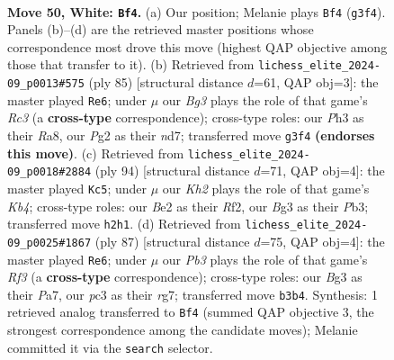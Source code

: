 \documentclass[11pt]{article}
\begin{document}
\clearpage

\begin{figure}[p]\centering
\begin{subfigure}{0.46\textwidth}\centering
\resizebox{\linewidth}{!}{%
\newchessgame
\chessboard[
  setfen={5b1r/p6p/P4k1n/3r4/8/1Pp3BP/R1P1B1PK/2R5 w - - 7 50},
  showmover=false,
  pgfstyle=straightmove, color=movearrow, markmove={g3-f4}
]}
\caption{}
\end{subfigure}\hfill
\begin{subfigure}{0.46\textwidth}\centering
\resizebox{\linewidth}{!}{%
\newchessgame
\chessboard[
  setfen={r5k1/3N1p1p/p1r3p1/B2p4/1PbP1P2/7P/5KP1/4R3 b - - 3 43},
  showmover=false,
  pgfstyle=straightmove, color=movearrow, markmove={c6-e6}
]}
\caption{}
\end{subfigure}
\\[4pt]
\begin{subfigure}{0.46\textwidth}\centering
\resizebox{\linewidth}{!}{%
\newchessgame
\chessboard[
  setfen={8/8/1Bp2k2/P3p2b/1KP2p1p/1P3P2/5R1P/r7 w - - 1 48},
  showmover=false,
  pgfstyle=straightmove, color=movearrow, markmove={b4-c5}
]}
\caption{}
\end{subfigure}\hfill
\begin{subfigure}{0.46\textwidth}\centering
\resizebox{\linewidth}{!}{%
\newchessgame
\chessboard[
  setfen={5r2/p4pR1/1kpb1r2/3p4/K2P4/2P5/1P2R3/8 b - - 8 44},
  showmover=false,
  pgfstyle=straightmove, color=movearrow, markmove={f6-e6}
]}
\caption{}
\end{subfigure}
\caption{\textbf{Move 50, White: \texttt{Bf4}.} (a) Our position; Melanie plays \texttt{Bf4} (\texttt{g3f4}). Panels (b)--(d) are the retrieved master positions whose correspondence most drove this move (highest QAP objective among those that transfer to it). (b) Retrieved from \texttt{lichess\_elite\_2024-09\_p0013\#575} (ply 85) [structural distance $d$=61, QAP obj=3]: the master played \texttt{Re6}; under $\mu$ our \emph{Bg3} plays the role of that game's \emph{Rc3} (a \textbf{cross-type} correspondence); cross-type roles: our \emph{P}h3 as their \emph{R}a8, our \emph{P}g2 as their \emph{n}d7; transferred move \texttt{g3f4} \textbf{(endorses this move)}. (c) Retrieved from \texttt{lichess\_elite\_2024-09\_p0018\#2884} (ply 94) [structural distance $d$=71, QAP obj=4]: the master played \texttt{Kc5}; under $\mu$ our \emph{Kh2} plays the role of that game's \emph{Kb4}; cross-type roles: our \emph{B}e2 as their \emph{R}f2, our \emph{B}g3 as their \emph{P}b3; transferred move \texttt{h2h1}. (d) Retrieved from \texttt{lichess\_elite\_2024-09\_p0025\#1867} (ply 87) [structural distance $d$=75, QAP obj=4]: the master played \texttt{Re6}; under $\mu$ our \emph{Pb3} plays the role of that game's \emph{Rf3} (a \textbf{cross-type} correspondence); cross-type roles: our \emph{B}g3 as their \emph{P}a7, our \emph{p}c3 as their \emph{r}g7; transferred move \texttt{b3b4}. Synthesis: 1 retrieved analog transferred to \texttt{Bf4} (summed QAP objective 3, the strongest correspondence among the candidate moves); Melanie committed it via the \texttt{search} selector.}
\label{fig:thought-m98}
\end{figure}
\end{document}
